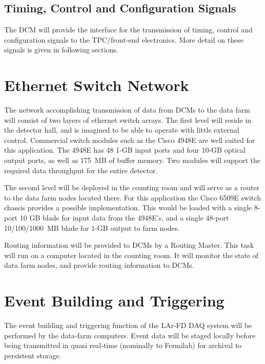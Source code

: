 \subsection{Timing, Control and Configuration Signals}

The DCM will provide the interface for the transmission of 
timing, control and configuration signals to the TPC/front-end electronics.
More detail on these signals is given in following sections.

\section{Ethernet Switch Network}
\label{sec:v5-trig-switch}

The network accomplishing transmission of data from DCMs to the data 
farm will consist of two layers of ethernet switch arrays.  
The first level will reside in the detector hall, and is imagined to be 
able to operate with little external control.  Commercial switch modules 
such as the Cisco 4948E are well suited for this application.  The 4948E 
has 48 1-GB input ports and four 10-GB optical output ports, 
as well as 175~MB of buffer memory.  Two modules will support the 
required data throughput for the entire detector.

The second level will be deployed in the counting room and will 
serve as a router to the data farm nodes located there.  For this application 
the Cisco 6509E switch chassis provides a possible implementation.  This 
would be loaded with a single 8-port 10 GB blade for input data from the 
4948E's, and a single 48-port 10/100/1000~MB blade for 1-GB output to 
farm nodes.

Routing information will be provided to DCMs by a Routing Master.  This 
task will run on a computer located in the counting room.  It will monitor 
the state of data farm nodes, and provide routing information to DCMs.


\section{Event Building and Triggering}
\label{sec:v5-trig-evtbuild}

The event building and triggering function of the LAr-FD DAQ system 
will be performed by the data-farm computers.  Event data will be staged 
locally before being transmitted in quasi real-time (nominally to Fermilab) 
for archival to persistent storage. 

